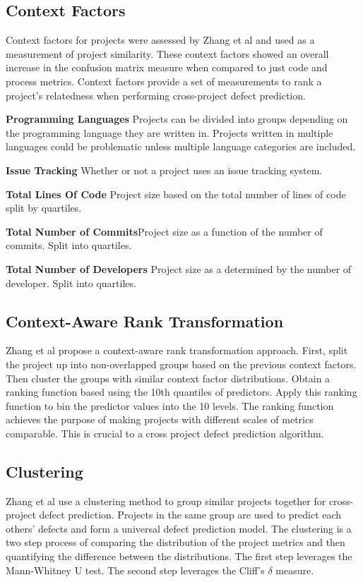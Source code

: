 \documentclass{sig-alternate-05-2015}
\begin{document}
\subsection{Context Factors}
Context factors for projects were assessed by Zhang et al \cite{Zhang2014} and used as a measurement of project similarity. These context factors showed an overall increase in the confusion matrix measure when compared to just code and process metrics. Context factors provide a set of measurements to rank a project's relatedness when performing cross-project defect prediction.

\textbf{Programming Languages} Projects can be divided into groups depending on the programming language they are written in. Projects written in multiple languages could be problematic unless multiple language categories are included.

\textbf{Issue Tracking} Whether or not a project uses an issue tracking system.

\textbf{Total Lines Of Code} Project size based on the total number of lines of code split by quartiles.

\textbf{Total Number of Commits}Project size as a function of the number of commits. Split into quartiles.

\textbf{Total Number of Developers} Project size as a determined by the number of developer. Split into quartiles.

\subsection{Context-Aware Rank Transformation}
Zhang et al \cite{Zhang2014} propose a context-aware rank transformation approach. First, split the project up into non-overlapped groups based on the previous context factors. Then cluster the groups with similar context factor distributions. Obtain a ranking function based using the 10th quantiles of predictors. Apply this ranking function to bin the predictor values into the 10 levels. The ranking function achieves the purpose of making projects with different scales of metrics comparable. This is crucial to a cross project defect prediction algorithm.  

\subsection{Clustering}
Zhang et al \cite{Zhang2014} use a clustering method to group similar projects together for cross-project defect prediction. Projects in the same group are used to predict each others' defects and form a universal defect prediction model. The clustering is a two step process of comparing the distribution of the project metrics and then quantifying the difference between the distributions. The first step leverages the Mann-Whitney U test. The second step leverages the Cliff's $\delta$ measure.
\end{document}
